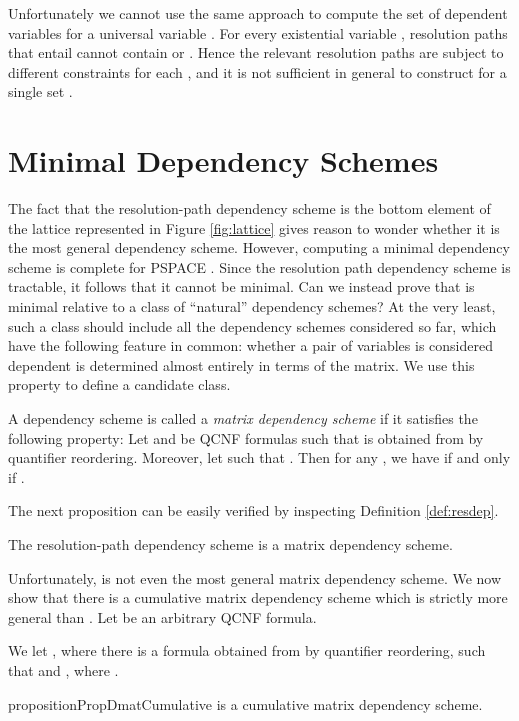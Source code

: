 \documentclass{llncs}
\newcommand{\shortversion}[1]{}
\def\hy{\hbox{-}\nobreak\hskip0pt} \newcommand{\ellipsis}{}
\begin{document}
Unfortunately we cannot use the same approach to compute the set of dependent
variables  for a universal variable . For every existential variable , resolution paths that entail 
cannot contain  or . Hence the relevant resolution paths are
subject to different constraints for each , and it is not sufficient in
general to construct  for a single set .

\section{Minimal Dependency Schemes}
The fact that the resolution\hy path dependency scheme is the bottom element
of the lattice represented in Figure \ref{fig:lattice} gives reason to wonder
whether it is the most general dependency scheme. However, computing a minimal
dependency scheme is complete for PSPACE \cite{SamerSzeider09a}. Since the
resolution path dependency scheme is tractable, it follows that it cannot be
minimal. Can we instead prove that  is minimal relative to a class of
``natural'' dependency schemes? At the very least, such a class should include
all the dependency schemes considered so far, which have the following feature
in common: whether a pair of variables is considered dependent is determined
almost entirely in terms of the matrix. We use this property to define a
candidate class.
\begin{definition} A dependency scheme  is called a \emph{matrix dependency
    scheme} if it satisfies the following property: Let  and  be
  QCNF formulas such that  is obtained from  by quantifier
  reordering. Moreover, let  such that . Then for any , we have 
  if and only if .
\end{definition}
The next proposition can be easily verified by inspecting Definition
\ref{def:resdep}.
\begin{proposition}
  The resolution\hy path dependency scheme  is a matrix
  dependency scheme.
\end{proposition}
Unfortunately,  is not even the most general matrix dependency
scheme. We now show that there is a cumulative matrix dependency scheme which
is strictly more general than . Let  be an arbitrary QCNF
formula.
\begin{definition} We let , where
   there is a formula  obtained from  by quantifier reordering, such that
   and ,
  where \hskip 0pt\hskip 0pt.
\end{definition}
\begin{restatable}{proposition}{PropDmatCumulative}\label{prop:dmatcumulative}\shortversion{\textup{()}}
 is a cumulative matrix dependency scheme.
\end{restatable}
\end{document}
